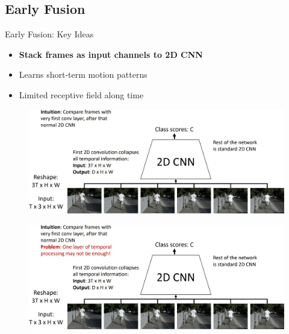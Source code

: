 \subsection{Early Fusion}

\begin{frame}[allowframebreaks]{Early Fusion: Key Ideas}
    \begin{itemize}
        \item \textbf{Stack frames as input channels to 2D CNN}
        \item Learns short-term motion patterns
        \item Limited receptive field along time
    \end{itemize}
\framebreak
    \begin{figure}
        \centering
        \includegraphics[width=1\textwidth,height=0.9\textheight,keepaspectratio]{images/video/slide_13_1_img.jpg}
    \end{figure}
\framebreak
    \begin{figure}
        \centering
        \includegraphics[width=1\textwidth,height=0.9\textheight,keepaspectratio]{images/video/slide_14_1_img.jpg}
    \end{figure}
\end{frame}